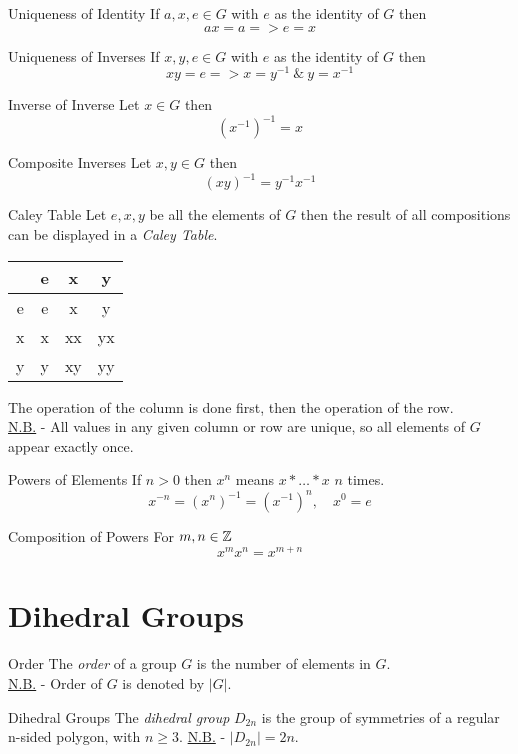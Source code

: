 \documentclass[11pt,a4paper]{article}
\begin{document}
\subtitle{Proposition 3.03 - }{Uniqueness of Identity}
If $a, x, e \in G$ with $e$ as the identity of $G$ then $$ax = a => e = x$$

\subtitle{Proposition 3.04 - }{Uniqueness of Inverses}
If $x, y, e \in G$ with $e$ as the identity of $G$ then $$xy = e => x = y^{-1}\ \&\ y = x^{-1}$$

\subtitle{Proposition 3.05 - }{Inverse of Inverse}
Let $x \in G$ then $$(x^{-1})^{-1} = x$$

\subtitle{Proposition 3.06 - }{Composite Inverses}
Let $x, y \in G$ then $$(xy)^{-1} = y^{-1}x^{-1}$$

\subtitle{Definition 3.07 - }{Caley Table}
Let $e, x, y$ be all the elements of $G$ then the result of all compositions can be displayed in a \textit{Caley Table}.
\begin{center}
\begin{tabular}{c|ccc}
 & e & x & y \\
 \hline
 e & e & x & y \\
 x & x & xx & yx \\
 y & y & xy & yy
\end{tabular}
\end{center}
The operation of the column is done first, then the operation of the row.\\
\underline{N.B.} - All values in any given column or row are unique, so all elements of $G$ appear exactly once.\\

\subtitle{Definition 3.08 - }{Powers of Elements}
If $n > 0$ then $x^n$ means $x * \dots * x$ $n$ times. $$x^{-n} = (x^{n})^{-1} = (x^{-1})^n,\quad x^0 = e$$

\subtitle{Definition 3.09 - }{Composition of Powers}
For $m,n \in \mathbb{Z}$ $$x^mx^n = x^{m+n}$$

\section{Dihedral Groups}

\subtitle{Definition 4.01 - }{Order}
The \textit{order} of a group $G$ is the number of elements in $G$.\\
\underline{N.B.} - Order of $G$ is denoted by $|G|$.\\

\subtitle{Definition 4.02 - }{Dihedral Groups}
The \textit{dihedral group} $D_{2n}$ is the group of symmetries of a regular n-sided polygon, with $n \geq 3$.
\underline{N.B.} - $|D_{2n}| = 2n$.\\
\end{document}
